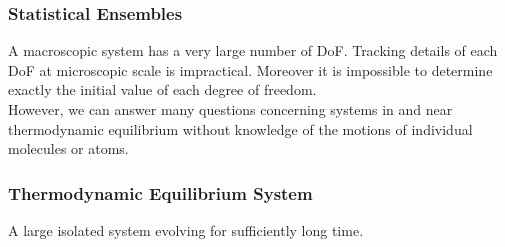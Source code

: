 \documentclass[../main/main.tex]{subfiles}
\begin{document}
\subsubsection*{Statistical Ensembles}
A macroscopic system has a very large number of DoF. Tracking details of each DoF at microscopic scale is impractical. Moreover it is impossible to determine exactly the initial value of each degree of freedom.\\

However, we can answer many questions concerning systems in and near thermodynamic equilibrium without knowledge of the motions of individual molecules or atoms.


\subsubsection*{Thermodynamic Equilibrium System}

\begin{example}
	A large isolated system evolving for sufficiently long time.
\end{example}
\end{document}
